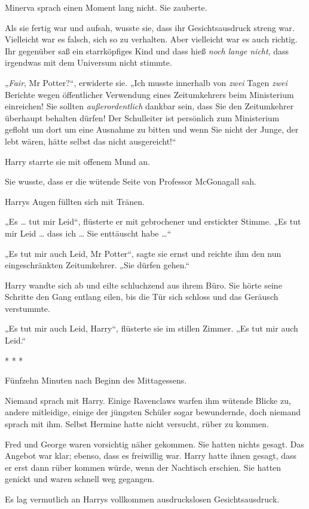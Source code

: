 {Minerva sprach einen Moment lang nicht. Sie zauberte.

Als sie fertig war und aufsah, wusste sie, dass ihr Gesichtsausdruck streng war. Vielleicht war es falsch, sich so zu verhalten. Aber vielleicht war es auch richtig. Ihr gegenüber saß ein starrköpfiges Kind und dass hieß \emph{noch lange nicht}, dass irgendwas mit dem Universum nicht stimmte.

„\emph{Fair}, Mr Potter?“, erwiderte sie. „Ich musste innerhalb von \emph{zwei} Tagen \emph{zwei} Berichte wegen öffentlicher Verwendung eines Zeitumkehrers beim Ministerium einreichen! Sie sollten \emph{außerordentlich} dankbar sein, dass Sie den Zeitumkehrer überhaupt behalten dürfen! Der Schulleiter ist persönlich zum Ministerium gefloht um dort um eine Ausnahme zu bitten und wenn Sie nicht der Junge, der lebt wären, hätte selbst das nicht ausgereicht!“

Harry starrte sie mit offenem Mund an.

Sie wusste, dass er die wütende Seite von Professor McGonagall sah.

Harrys Augen füllten sich mit Tränen.

„Es … tut mir Leid“, flüsterte er mit gebrochener und erstickter Stimme. „Es tut mir Leid … dass ich … Sie enttäuscht habe …“

„Es tut mir auch Leid, Mr Potter“, sagte sie ernst und reichte ihm den nun eingeschränkten Zeitumkehrer. „Sie dürfen gehen.“

Harry wandte sich ab und eilte schluchzend aus ihrem Büro. Sie hörte seine Schritte den Gang entlang eilen, bis die Tür sich schloss und das Geräusch verstummte.

„Es tut mir auch Leid, Harry“, flüsterte sie im stillen Zimmer. „Es tut mir auch Leid.“

* * *

Fünfzehn Minuten nach Beginn des Mittagessens.

Niemand sprach mit Harry. Einige Ravenclaws warfen ihm wütende Blicke zu, andere mitleidige, einige der jüngsten Schüler sogar bewundernde, doch niemand sprach mit ihm. Selbst Hermine hatte nicht versucht, rüber zu kommen.

Fred und George waren vorsichtig näher gekommen. Sie hatten nichts gesagt. Das Angebot war klar; ebenso, dass es freiwillig war. Harry hatte ihnen gesagt, dass er erst dann rüber kommen würde, wenn der Nachtisch erschien. Sie hatten genickt und waren schnell weg gegangen.

Es lag vermutlich an Harrys vollkommen ausdruckslosen Gesichtsausdruck.

}
